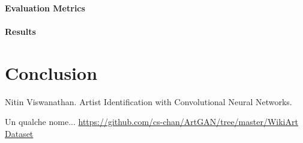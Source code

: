 \documentclass{article}
\begin{document}
\paragraph{Evaluation Metrics}

\paragraph{Results}




\section{Conclusion}

\begin{thebibliography}{1}
	
	Nitin Viswanathan.
	\newblock Artist Identification with Convolutional Neural Networks. 
	
	Un qualche nome... \newblock
	\url{https://github.com/cs-chan/ArtGAN/tree/master/WikiArt Dataset}
	
\end{thebibliography}
\end{document}
